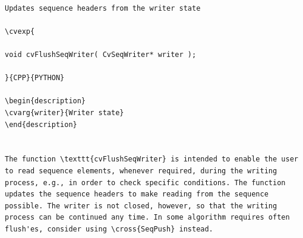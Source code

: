 \label{FlushSeqWriter}
\begin{verbatim}

Updates sequence headers from the writer state

\cvexp{

void cvFlushSeqWriter( CvSeqWriter* writer );

}{CPP}{PYTHON}

\begin{description}
\cvarg{writer}{Writer state}
\end{description}


The function \texttt{cvFlushSeqWriter} is intended to enable the user to read sequence elements, whenever required, during the writing process, e.g., in order to check specific conditions. The function updates the sequence headers to make reading from the sequence possible. The writer is not closed, however, so that the writing process can be continued any time. In some algorithm requires often flush'es, consider using \cross{SeqPush} instead.


\end{verbatim}
\label{StartReadSeq}
